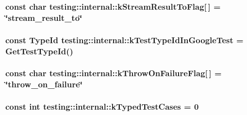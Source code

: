 \subsubsection[{\texorpdfstring{k\+Stream\+Result\+To\+Flag}{kStreamResultToFlag}}]{\setlength{\rightskip}{0pt plus 5cm}const char testing\+::internal\+::k\+Stream\+Result\+To\+Flag\mbox{[}$\,$\mbox{]} = \char`\"{}stream\+\_\+result\+\_\+to\char`\"{}}\hypertarget{namespacetesting_1_1internal_a84f8a2102d45c8b2b35be06d14ffefb8}{}\label{namespacetesting_1_1internal_a84f8a2102d45c8b2b35be06d14ffefb8}
\subsubsection[{\texorpdfstring{k\+Test\+Type\+Id\+In\+Google\+Test}{kTestTypeIdInGoogleTest}}]{\setlength{\rightskip}{0pt plus 5cm}const {\bf Type\+Id} testing\+::internal\+::k\+Test\+Type\+Id\+In\+Google\+Test = {\bf Get\+Test\+Type\+Id}()}\hypertarget{namespacetesting_1_1internal_acac7993efabbd9dd62c1e9c7d143a72f}{}\label{namespacetesting_1_1internal_acac7993efabbd9dd62c1e9c7d143a72f}
\subsubsection[{\texorpdfstring{k\+Throw\+On\+Failure\+Flag}{kThrowOnFailureFlag}}]{\setlength{\rightskip}{0pt plus 5cm}const char testing\+::internal\+::k\+Throw\+On\+Failure\+Flag\mbox{[}$\,$\mbox{]} = \char`\"{}throw\+\_\+on\+\_\+failure\char`\"{}}\hypertarget{namespacetesting_1_1internal_ad9efcf363de3483afd91c7393a4fefb8}{}\label{namespacetesting_1_1internal_ad9efcf363de3483afd91c7393a4fefb8}
\subsubsection[{\texorpdfstring{k\+Typed\+Test\+Cases}{kTypedTestCases}}]{\setlength{\rightskip}{0pt plus 5cm}const int testing\+::internal\+::k\+Typed\+Test\+Cases = 0}\hypertarget{namespacetesting_1_1internal_a685ea5332074ae63b0ded2b184ac2271}{}\label{namespacetesting_1_1internal_a685ea5332074ae63b0ded2b184ac2271}
